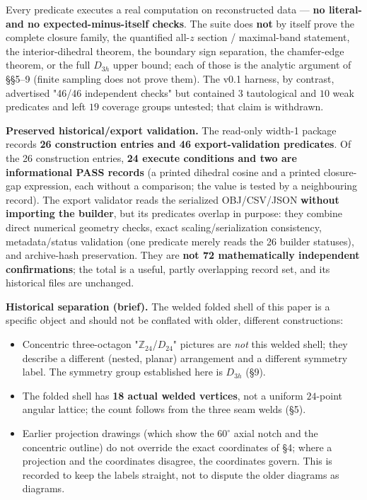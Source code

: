 \documentclass[
  11pt,
  a4paper,
]{article}
\providecommand{\tightlist}{%
  \setlength{\itemsep}{0pt}\setlength{\parskip}{0pt}}
\begin{document}
Every predicate executes a real computation on reconstructed data --- \textbf{no literal- and no expected-minus-itself checks}. The suite does \textbf{not} by itself prove the complete closure family, the quantified all-\(z\) section / maximal-band statement, the interior-dihedral theorem, the boundary sign separation, the chamfer-edge theorem, or the full \(D_{3h}\) upper bound; each of those is the analytic argument of §§5--9 (finite sampling does not prove them). The v0.1 harness, by contrast, advertised "46/46 independent checks" but contained \(3\) tautological and \(10\) weak predicates and left \(19\) coverage groups untested; that claim is withdrawn.

\textbf{Preserved historical/export validation.} The read-only width-1 package records \textbf{26 construction entries and 46 export-validation predicates}. Of the 26 construction entries, \textbf{24 execute conditions and two are informational PASS records} (a printed dihedral cosine and a printed closure-gap expression, each without a comparison; the value is tested by a neighbouring record). The export validator reads the serialized OBJ/CSV/JSON \textbf{without importing the builder}, but its predicates overlap in purpose: they combine direct numerical geometry checks, exact scaling/serialization consistency, metadata/status validation (one predicate merely reads the 26 builder statuses), and archive-hash preservation. They are \textbf{not 72 mathematically independent confirmations}; the total is a useful, partly overlapping record set, and its historical files are unchanged.

\textbf{Historical separation (brief).} The welded folded shell of this paper is a specific object and should not be conflated with older, different constructions:

\begin{itemize}
\tightlist
\item
  Concentric three-octagon "\(\mathbb Z_{24}\)/\(D_{24}\)" pictures are \emph{not} this welded shell; they describe a different (nested, planar) arrangement and a different symmetry label. The symmetry group established here is \(D_{3h}\) (§9).
\item
  The folded shell has \textbf{18 actual welded vertices}, not a uniform \(24\)-point angular lattice; the count follows from the three seam welds (§5).
\item
  Earlier projection drawings (which show the \(60^\circ\) axial notch and the concentric outline) do not override the exact coordinates of §4; where a projection and the coordinates disagree, the coordinates govern. This is recorded to keep the labels straight, not to dispute the older diagrams as diagrams.
\end{itemize}
\end{document}
